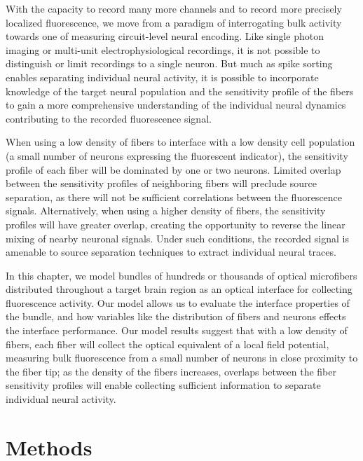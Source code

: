 With the capacity to record many more channels and to record more precisely localized fluorescence, we move from a paradigm of interrogating bulk activity towards one of measuring circuit-level neural encoding. Like single photon imaging or multi-unit electrophysiological recordings, it is not possible to distinguish or limit recordings to a single neuron. But much as spike sorting enables separating individual neural activity, it is possible to incorporate knowledge of the target neural population and the sensitivity profile of the fibers to gain a more comprehensive understanding of the individual neural dynamics contributing to the recorded fluorescence signal. 

When using a low density of fibers to interface with a low density cell population (a small number of neurons expressing the fluorescent indicator), the sensitivity profile of each fiber will be dominated by one or two neurons. Limited overlap between the sensitivity profiles of neighboring fibers will preclude source separation, as there will not be sufficient correlations between the fluorescence signals. Alternatively, when using a higher density of fibers, the sensitivity profiles will have greater overlap, creating the opportunity to reverse the linear mixing of nearby neuronal signals. Under such conditions, the recorded signal is amenable to source separation techniques to extract individual neural traces.

In this chapter, we model bundles of hundreds or thousands of optical microfibers distributed throughout a target brain region as an optical interface for collecting fluorescence activity. Our model allows us to evaluate the interface properties of the bundle, and how variables like the distribution of fibers and neurons effects the interface performance. Our model results suggest that with a low density of fibers, each fiber will collect the optical equivalent of a local field potential, measuring bulk fluorescence from a small number of neurons in close proximity to the fiber tip; as the density of the fibers increases, overlaps between the fiber sensitivity profiles will enable collecting sufficient information to separate individual neural activity.

\section{Methods}
\label{sec:methods-modeling}

